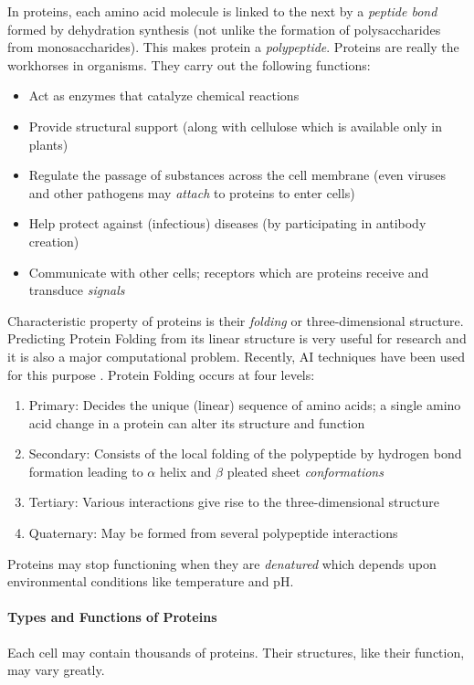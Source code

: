 \documentclass[12pt]{article}
\begin{document}
In proteins, each amino acid molecule is linked to the next by a \emph{peptide bond} formed by dehydration synthesis (not unlike the formation of polysaccharides from monosaccharides). This makes protein a \emph{polypeptide}. Proteins are really the workhorses in organisms. They carry out the following functions:
\begin{itemize}
    \item Act as enzymes that catalyze chemical reactions
    \item Provide structural support (along with cellulose which is available only in plants)
    \item Regulate the passage of substances across the cell membrane (even viruses and other pathogens may \emph{attach} to proteins to enter cells)
    \item Help protect against (infectious) diseases (by participating in antibody creation)
    \item Communicate with other cells; receptors which are proteins receive and transduce \emph{signals}
\end{itemize}

Characteristic property of proteins is their \emph{folding} or three-dimensional structure. Predicting Protein Folding from its linear structure is very useful for research and it is also a major computational problem. Recently, AI techniques have been used for this purpose \cite{alphafold}. Protein Folding occurs at four levels:
\begin{enumerate}
    \item Primary: Decides the unique (linear) sequence of amino acids; a single amino acid change in a protein can alter its structure and function
    \item Secondary: Consists of the local folding of the polypeptide by hydrogen bond formation leading to $\alpha$ helix and $\beta$ pleated sheet \emph{conformations}
    \item Tertiary: Various interactions give rise to the three-dimensional structure
    \item Quaternary: May be formed from several polypeptide interactions
\end{enumerate}

Proteins may stop functioning when they are \emph{denatured} which depends upon environmental conditions like temperature and pH.

\paragraph{Types and Functions of Proteins}
Each cell may contain thousands of proteins. Their structures, like their function, may vary greatly. 
\end{document}
